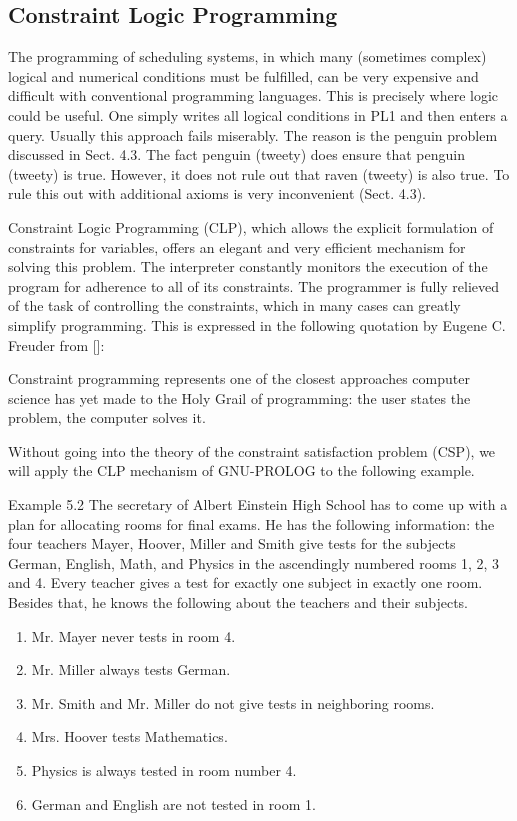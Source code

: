\documentclass[10pt]{book}
\begin{document}
\subsection{Constraint Logic Programming}
The programming of scheduling systems, in which many (sometimes complex) logical and numerical conditions must be fulfilled, can be very expensive and difficult with conventional programming languages. This is precisely where logic could be useful. One simply writes all logical conditions in PL1 and then enters a query. Usually this approach fails miserably. The reason is the penguin problem discussed in Sect. 4.3. The fact penguin (tweety) does ensure that penguin (tweety) is true. However, it does not rule out that raven (tweety) is also true. To rule this out with additional axioms is very inconvenient (Sect. 4.3).

Constraint Logic Programming (CLP), which allows the explicit formulation of constraints for variables, offers an elegant and very efficient mechanism for solving this problem. The interpreter constantly monitors the execution of the program for adherence to all of its constraints. The programmer is fully relieved of the task of controlling the constraints, which in many cases can greatly simplify programming. This is expressed in the following quotation by Eugene C. Freuder from [\cite{fre97}]:
\begin{displayquote}
Constraint programming represents one of the closest approaches computer science has yet made to the Holy Grail of programming: the user states the problem, the computer solves it.
\end{displayquote}

Without going into the theory of the constraint satisfaction problem (CSP), we will apply the CLP mechanism of GNU-PROLOG to the following example.

Example 5.2 The secretary of Albert Einstein High School has to come up with a plan for allocating rooms for final exams. He has the following information: the four teachers Mayer, Hoover, Miller and Smith give tests for the subjects German, English, Math, and Physics in the ascendingly numbered rooms 1, 2, 3 and 4. Every teacher gives a test for exactly one subject in exactly one room. Besides that, he knows the following about the teachers and their subjects.

\begin{enumerate}
  \item Mr. Mayer never tests in room 4.
  \item Mr. Miller always tests German.
  \item Mr. Smith and Mr. Miller do not give tests in neighboring rooms.
  \item Mrs. Hoover tests Mathematics.
  \item Physics is always tested in room number 4.
  \item German and English are not tested in room 1.
\end{enumerate}
\end{document}
